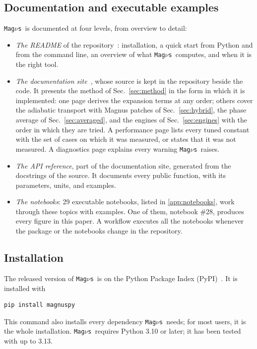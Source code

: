 \documentclass[final,5p,times,twocolumn,sort,compress]{elsarticle}
\makeatletter
\DeclareRobustCommand{\_}{%
  \ifmmode\nfss@text{\textunderscore}\else\textunderscore\allowbreak\fi}
\newcommand{\magnus}{{\tt Mag}\ensuremath{\nu}{\tt s}}
\makeatother
\begin{document}


\subsection{Documentation and executable examples}
\label{sec:documentation}

\magnus\ is documented at four levels, from overview to detail:
\begin{itemize}
\item \emph{The README} of the repository~\cite{Magnus}: installation, a quick start from Python and from the command line, an overview of what \magnus\ computes, and when it is the right tool.
\item \emph{The documentation site}\ \cite{MagnusDocs}, whose source is kept in the repository beside the code. It presents the method of Sec.~\ref{sec:method} in the form in which it is implemented: one page derives the expansion terms at any order; others cover the adiabatic transport with Magnus patches of Sec.~\ref{sec:hybrid}, the phase average of Sec.~\ref{sec:averaged}, and the engines of Sec.~\ref{sec:engines} with the order in which they are tried. A performance page lists every tuned constant with the set of cases on which it was measured, or states that it was not measured. A diagnostics page explains every warning \magnus\ raises.
\item \emph{The API reference}, part of the documentation site, generated from the docstrings of the source. It documents every public function, with its parameters, units, and examples.
\item \emph{The notebooks}: 29 executable notebooks, listed in \ref{app:notebooks}, work through these topics with examples. One of them, notebook \#28, produces every figure in this paper. A workflow executes all the notebooks whenever the package or the notebooks change in the repository.
\end{itemize}


\subsection{Installation}

The released version of \magnus\ is on the Python Package Index (PyPI)\ \cite{MagnusPyPI}. It is installed with
\begin{verbatim}
pip install magnuspy
\end{verbatim}
This command also installs every dependency \magnus\ needs; for most users, it is the whole installation. \magnus\ requires Python 3.10 or later; it has been tested with up to 3.13.
\end{document}
